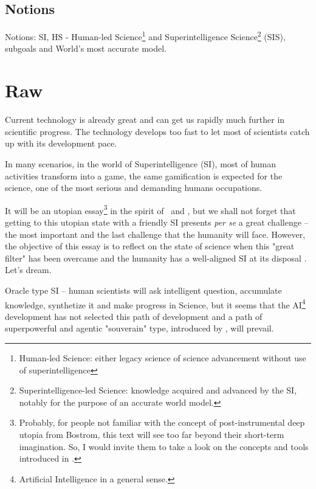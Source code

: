 \documentclass[a4paper,11pt]{article}
\begin{document}
\subsection{Notions}

Notions: SI, HS - Human-led Science\footnote{Human-led Science: either legacy science of science advancement without use of superintelligence} and Superintelligence Science\footnote{Superintelligence-led Science: knowledge acquired and advanced by the SI, notably for the purpose of an accurate world model.} (SIS), subgoals and World's most accurate model.


    \section{Raw}

    Current technology is already great and can get us rapidly much further in scientific progress. The technology develops too fast to let most of scientists catch up with its development pace.

    In many scenarios, in the world of Superintelligence (SI), most of human activities transform into a game, the same gamification is expected for the science, one of the most serious and demanding humans occupations.
    
    It will be an utopian essay\footnote{Probably, for people not familiar with the concept of post-instrumental deep utopia from Bostrom, this text will see too far beyond their short-term imagination. So, I would invite them to take a look on the concepts and tools introduced in \textcite{DeepUtopia}.} in the spirit of~\parencite{DeepUtopia} and \parencite{LovingGrace}, but we shall not forget that getting to this utopian state with a friendly SI presents \textit{per se} a great challenge -- the most important and the last challenge that the humanity will face. However, the objective of this essay is to reflect on the state of science when this "great filter" has been overcame and the humanity has a well-aligned SI at its disposal \parencite{Yudkowsky2008,Yampolskiy2016,Yudkowsky2022}. Let's dream.

    Oracle type SI -- human scientists will ask intelligent question, accumulate knowledge, synthetize it and make progress in Science, but it seems that the AI\footnote{Artificial Intelligence in a general sense.} development has not selected this path of development and a path of superpowerful and agentic "souverain" type, introduced by \textcite{Bostrom2014}, will prevail.
\end{document}
